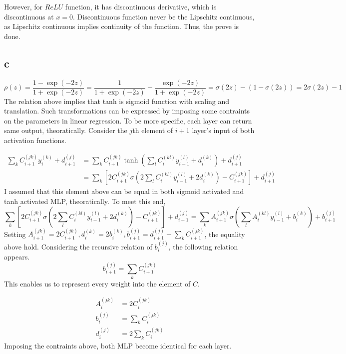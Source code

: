 \documentclass[10pt]{article}
\begin{document}
However, for $ReLU$ function, it has discontinuous derivative, which is discontinuous at $x = 0$. Discontinuous function never be the Lipschitz continuous, as Lipschitz continuous implies continuity of the function. Thus, the prove is done. 

\subsection*{c}
\begin{equation*}
    \rho(z) = \frac{1 - \exp{(-2z)}}{1+\exp{(-2z)}} = \frac{1}{1+\exp{(-2z)}} - \frac{\exp{(-2z)}}{1+\exp{(-2z)}} = \sigma(2z) - (1-\sigma(2z)) = 2\sigma(2z)-1
\end{equation*}
The relation above implies that tanh is sigmoid function with scaling and translation. Such transformations can be expressed by imposing some contraints on the parameters in linear regression.
To be more specific, each layer can return same output, theoratically. Consider the $j$th element of $i+1$ layer's input of both activation functions.

\begin{align*}
    \sum_k C_{i+1}^{(jk)}y_i^{(k)} + d_{i+1}^{(j)} &=\sum_k C_{i+1}^{(jk)}\tanh\left(\sum_lC_i^{(kl)}y_{i-1}^{(l)} + d_i^{(k)}\right) + d_{i+1}^{(j)}  \\
    &= \sum_k \left[ 2C_{i+1}^{(jk)}\sigma\left(2\sum_l C_i^{(kl)}y_{i-1}^{(l)} + 2d_i^{(k)}\right) - C_{i+1}^{(jk)}\right] + d_{i+1}^{(j)}
\end{align*}
I assumed that this element above can be equal in both sigmoid activated and tanh activated MLP, theoratically. To meet this end, 
\begin{equation*}
    \sum_k \left[ 2C_{i+1}^{(jk)}\sigma\left(2\sum_l C_i^{(kl)}y_{i-1}^{(l)} + 2d_i^{(k)}\right) - C_{i+1}^{(jk)}\right] + d_{i+1}^{(j)} = \sum_k A_{i+1}^{(jk)} \sigma\left(\sum_l A_i^{(kl)} y_{i-1}^{(l)} + b_i^{(k)}\right) + b_{i+1}^{(j)}
\end{equation*}
Setting $A_{i+1}^{(jk)} = 2C_{i+1}^{(jk)}, d_i^{(k)} = 2b_i^{(k)}, b_{i+1}^{(j)} = d_{i+1}^{(j)} - \sum_k C_{i+1}^{(jk)}$, the equality above hold. 
Considering the recursive relation of $b_i^{(j)}$, the following relation appears.
\begin{equation*}
    b_{i+1}^{(j)} = \sum_k C_{i+1}^{(jk)}
\end{equation*} 
This enables us to represent every weight into the element of $C$. 

\begin{align*}
    A_{i}^{(jk)} &= 2C_{i}^{(jk)} \\ b_{i}^{(j)} &= \sum_k C_{i}^{(jk)} \\ d_i^{(j)} &= 2\sum_k C_{i}^{(jk)}
\end{align*}
Imposing the contraints above, both MLP become identical for each layer. 
\end{document}

